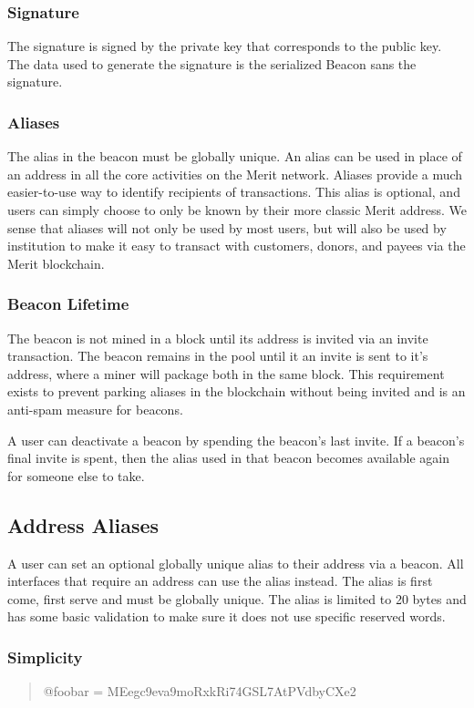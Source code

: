 \documentclass{article}
\begin{document}
\subsubsection{Signature}

The signature is signed by the private key that corresponds to the public key.
The data used to generate the signature is the serialized Beacon sans the signature.

\subsubsection{Aliases}
The alias in the beacon must be globally unique. An alias can be used in place of an
address in all the core activities on the Merit network.  Aliases provide a much easier-to-use 
way to identify recipients of
transactions. This alias is optional, and users can simply choose to only be known by their 
more classic Merit address.  We sense that aliases will not only be used by most users, but will also be 
used by institution to make it easy to transact with customers, donors, and payees via the Merit 
blockchain.

\subsubsection{Beacon Lifetime}
The beacon is not mined in a block until its address is invited via an \gls{invite}
transaction. The beacon remains in the pool until it an invite is sent to it's
address, where a miner will package both in the same block. This requirement
exists to prevent parking aliases in the blockchain without being invited and
is an anti-spam measure for beacons.

A user can deactivate a beacon by spending the beacon's last invite. If a beacon's
final invite is spent, then the alias used in that beacon becomes available again
for someone else to take.

\subsection{Address Aliases}

A user can set an optional globally unique alias to their address via a beacon.
All interfaces that require an address can use the alias instead.
The alias is first come, first serve and must be globally unique.
The alias is limited to 20 bytes and has some basic validation to make sure it
does not use specific reserved words.

\subsubsection{Simplicity}
\begin{quote}
    @foobar = MEegc9eva9moRxkRi74GSL7AtPVdbyCXe2
\end{quote}
\end{document}
